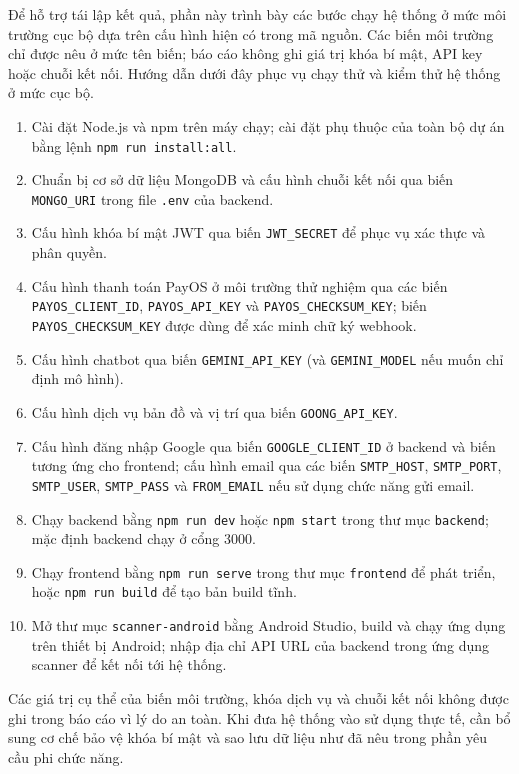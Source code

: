 ﻿\documentclass[../DoAn.tex]{subfiles}
\begin{document}
Để hỗ trợ tái lập kết quả, phần này trình bày các bước chạy hệ thống ở mức môi trường cục bộ dựa trên cấu hình hiện có trong mã nguồn. Các biến môi trường chỉ được nêu ở mức tên biến; báo cáo không ghi giá trị khóa bí mật, API key hoặc chuỗi kết nối. Hướng dẫn dưới đây phục vụ chạy thử và kiểm thử hệ thống ở mức cục bộ.
\begin{enumerate}[leftmargin=1.6cm]
\item Cài đặt Node.js và npm trên máy chạy; cài đặt phụ thuộc của toàn bộ dự án bằng lệnh \texttt{npm run install:all}.
\item Chuẩn bị cơ sở dữ liệu MongoDB và cấu hình chuỗi kết nối qua biến \texttt{MONGO\_URI} trong file \texttt{.env} của backend.
\item Cấu hình khóa bí mật JWT qua biến \texttt{JWT\_SECRET} để phục vụ xác thực và phân quyền.
\item Cấu hình thanh toán PayOS ở môi trường thử nghiệm qua các biến \texttt{PAYOS\_CLIENT\_ID}, \texttt{PAYOS\_API\_KEY} và \texttt{PAYOS\_CHECKSUM\_KEY}; biến \texttt{PAYOS\_CHECKSUM\_KEY} được dùng để xác minh chữ ký webhook.
\item Cấu hình chatbot qua biến \texttt{GEMINI\_API\_KEY} (và \texttt{GEMINI\_MODEL} nếu muốn chỉ định mô hình).
\item Cấu hình dịch vụ bản đồ và vị trí qua biến \texttt{GOONG\_API\_KEY}.
\item Cấu hình đăng nhập Google qua biến \texttt{GOOGLE\_CLIENT\_ID} ở backend và biến tương ứng cho frontend; cấu hình email qua các biến \texttt{SMTP\_HOST}, \texttt{SMTP\_PORT}, \texttt{SMTP\_USER}, \texttt{SMTP\_PASS} và \texttt{FROM\_EMAIL} nếu sử dụng chức năng gửi email.
\item Chạy backend bằng \texttt{npm run dev} hoặc \texttt{npm start} trong thư mục \texttt{backend}; mặc định backend chạy ở cổng 3000.
\item Chạy frontend bằng \texttt{npm run serve} trong thư mục \texttt{frontend} để phát triển, hoặc \texttt{npm run build} để tạo bản build tĩnh.
\item Mở thư mục \texttt{scanner-android} bằng Android Studio, build và chạy ứng dụng trên thiết bị Android; nhập địa chỉ API URL của backend trong ứng dụng scanner để kết nối tới hệ thống.
\end{enumerate}

Các giá trị cụ thể của biến môi trường, khóa dịch vụ và chuỗi kết nối không được ghi trong báo cáo vì lý do an toàn. Khi đưa hệ thống vào sử dụng thực tế, cần bổ sung cơ chế bảo vệ khóa bí mật và sao lưu dữ liệu như đã nêu trong phần yêu cầu phi chức năng.
\end{document}
